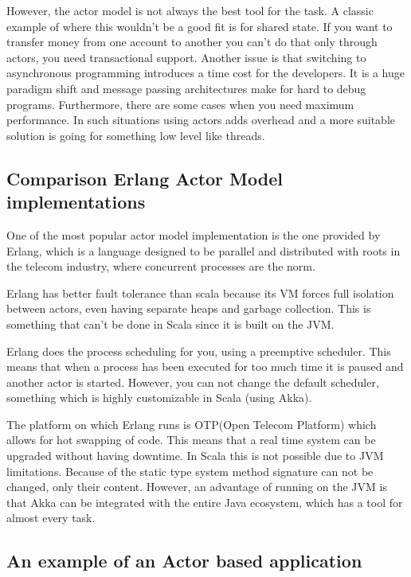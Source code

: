 \documentclass[12pt]{article}
\begin{document}
	However, the actor model is not always the best tool for the task. A classic example 
	of where this wouldn't be a good fit is for shared state\cite{ScalaInAction}. If you want to transfer 
	money from one account to another you can't do that only through actors, you need 
	transactional support. Another issue is that switching to asynchronous programming 
	introduces a time cost for the developers. It is a huge paradigm shift and message 
	passing architectures make for hard to debug programs. Furthermore, there are some 
	cases when you need maximum performance. In such situations using actors adds overhead 
	and a more suitable solution is going for something low level like threads.

	\subsection{Comparison Erlang Actor Model implementations}
	One of the most popular actor model implementation is the one provided by Erlang, 
	which is a language designed to be parallel and distributed with roots in the 
	telecom industry, where concurrent processes are the norm.

	Erlang has better fault tolerance than scala because its VM forces full isolation 
	between actors, even having separate heaps and garbage collection\cite{ErlangVsScala}. This is something 
	that can't be done in Scala since it is built on the JVM.

	Erlang does the process scheduling for you, using a preemptive scheduler\cite{ErlangVsScala}. This means 
	that when a process has been executed for too much time it is paused and another 
	actor is started. However, you can not change the default scheduler, something which 
	is highly customizable in Scala (using Akka).

	The platform on which Erlang runs is OTP(Open Telecom Platform) which allows for hot swapping of code\cite{ErlangVsScala}. 
	This means that a real time system can be upgraded without having downtime. In Scala this is not 
	possible due to JVM limitations. Because of the static type system method signature can not 
	be changed, only their content. However, an advantage of running on the JVM is that Akka can 
	be integrated with the entire Java ecosystem, which has a tool for almost every task.

	\subsection{An example of an Actor based application}
\end{document}
